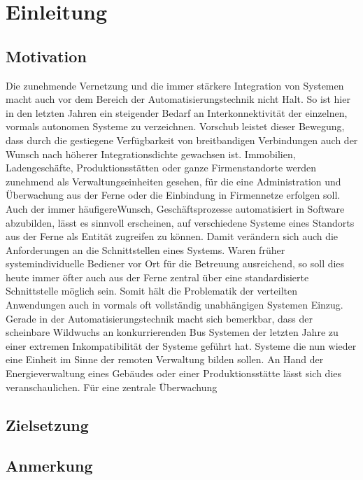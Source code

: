 \chapter{Einleitung}

\thispagestyle{standard}
\pagestyle{standard}
\section{Motivation}

Die zunehmende Vernetzung und die immer stärkere Integration von Systemen macht
auch vor dem Bereich der Automatisierungstechnik nicht Halt. So ist hier in den letzten
Jahren ein steigender Bedarf an Interkonnektivität der einzelnen, vormals autonomen
Systeme zu verzeichnen. Vorschub leistet dieser Bewegung, dass durch die gestiegene
Verfügbarkeit von breitbandigen Verbindungen auch der Wunsch nach höherer Integrationsdichte
gewachsen ist. Immobilien, Ladengeschäfte, Produktionsstätten oder ganze
Firmenstandorte werden zunehmend als Verwaltungseinheiten gesehen, für die eine Administration
und Überwachung aus der Ferne oder die Einbindung in Firmennetze erfolgen
soll.
Auch der immer häufigereWunsch, Geschäftsprozesse automatisiert in Software abzubilden,
lässt es sinnvoll erscheinen, auf verschiedene Systeme eines Standorts aus der Ferne
als Entität zugreifen zu können. Damit verändern sich auch die Anforderungen an die
Schnittstellen eines Systems. Waren früher systemindividuelle Bediener vor Ort für die
Betreuung ausreichend, so soll dies heute immer öfter auch aus der Ferne zentral über
eine standardisierte Schnittstelle möglich sein. Somit hält die Problematik der verteilten
Anwendungen auch in vormals oft vollständig unabhängigen Systemen Einzug.
Gerade in der Automatisierungstechnik macht sich bemerkbar, dass der scheinbare Wildwuchs
an konkurrierenden Bus Systemen der letzten Jahre zu einer extremen Inkompatibilität
der Systeme geführt hat. Systeme die nun wieder eine Einheit im Sinne der remoten
Verwaltung bilden sollen. An Hand der Energieverwaltung eines Gebäudes oder
einer Produktionsstätte lässt sich dies veranschaulichen. Für eine zentrale Überwachung



\section{Zielsetzung}

\section{Anmerkung}

